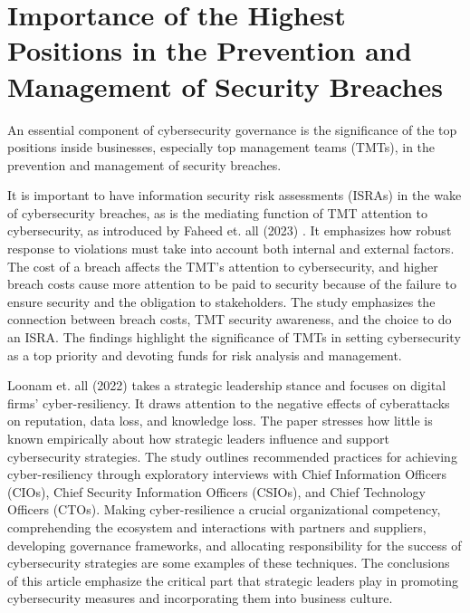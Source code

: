 \documentclass[journal]{IEEEtran}
\begin{document}
\section{Importance of the Highest Positions in the Prevention and Management of Security Breaches}

An essential component of cybersecurity governance is the significance of the top positions inside businesses, especially top management teams (TMTs), in the prevention and management of security breaches. 

It is important to have information security risk assessments (ISRAs) in the wake of cybersecurity breaches, as is the mediating function of TMT attention to cybersecurity, as introduced by Faheed et. all (2023) . It emphasizes how robust response to violations must take into account both internal and external factors. The cost of a breach affects the TMT's attention to cybersecurity, and higher breach costs cause more attention to be paid to security because of the failure to ensure security and the obligation to stakeholders. The study emphasizes the connection between breach costs, TMT security awareness, and the choice to do an ISRA. The findings highlight the significance of TMTs in setting cybersecurity as a top priority and devoting funds for risk analysis and management.

Loonam et. all (2022) takes a strategic leadership stance and focuses on digital firms' cyber-resiliency. It draws attention to the negative effects of cyberattacks on reputation, data loss, and knowledge loss. The paper stresses how little is known empirically about how strategic leaders influence and support cybersecurity strategies. The study outlines recommended practices for achieving cyber-resiliency through exploratory interviews with Chief Information Officers (CIOs), Chief Security Information Officers (CSIOs), and Chief Technology Officers (CTOs). Making cyber-resilience a crucial organizational competency, comprehending the ecosystem and interactions with partners and suppliers, developing governance frameworks, and allocating responsibility for the success of cybersecurity strategies are some examples of these techniques. The conclusions of this article emphasize the critical part that strategic leaders play in promoting cybersecurity measures and incorporating them into business culture.
\end{document}
